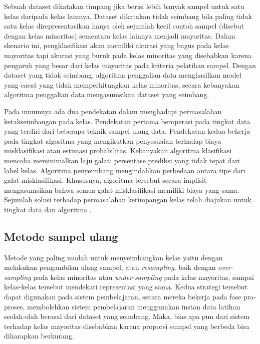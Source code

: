 Sebuah dataset dikatakan timpang jika berisi lebih banyak sampel untuk satu
kelas daripada kelas lainnya.
Dataset dikatakan tidak seimbang bila paling tidak satu kelas direpresentasikan
hanya oleh sejumlah kecil contoh sampel (disebut dengan kelas minoritas)
sementara kelas lainnya menjadi mayoritas.
Dalam skenario ini, pengklasifikasi akan memiliki akurasi yang bagus pada kelas
mayoritas tapi akurasi yang buruk pada kelas minoritas yang disebabkan karena
pengaruh yang besar dari kelas mayoritas pada kriteria pelatihan sampel.
Dengan dataset yang tidak seimbang, algoritma penggalian data menghasilkan
model yang cacat yang tidak memperhitungkan kelas minoritas, secara kebanyakan
algoritma penggalian data mengasumsikan dataset yang seimbang.

Pada umumnya ada dua pendekatan dalam menghadapi permasalahan ketakseimbangan
pada kelas.
Pendekatan pertama beroperasi pada tingkat data yang terdiri dari
beberapa teknik sampel ulang data.
Pendekatan kedua bekerja pada tingkat algoritma yang mengikutkan penyesuaian
terhadap biaya misklasifikasi atau estimasi probabilitas.
Kebanyakan algoritma klasifikasi mencoba meminimalkan laju galat: persentase
prediksi yang tidak tepat dari label kelas.
Algoritma penyeimbang mengindahkan perbedaan antara tipe dari galat
misklasifikasi.
Khususnya, algoritma tersebut secara implisit mengasumsikan bahwa semua galat
misklasifikasi memiliki biaya yang sama.
Sejumlah solusi terhadap permasalahan ketimpangan kelas telah diajukan untuk
tingkat data dan algoritma \parencite{chawla2004editorial}.

\label{subsec:metode-resampling}
\subsection{Metode sampel ulang}

Metode yang paling mudah untuk menyeimbangkan kelas yaitu dengan melakukan
pengambilan ulang sampel, atau \textit{resampling}, baik dengan
\textit{over-sampling} pada kelas minoritas atau \textit{under-sampling} pada
kelas mayoritas, sampai kelas-kelas tersebut mendekati representasi yang sama.
Kedua strategi tersebut dapat digunakan pada sistem pembelajaran, secara mereka
bekerja pada fase pra-proses, membolehkan sistem pembelajaran menggunakan
instan data latihan seolah-olah berasal dari dataset yang seimbang.
Maka, bias apa pun dari sistem terhadap kelas mayoritas disebabkan karena
proporsi sampel yang berbeda bisa diharapkan berkurang.


